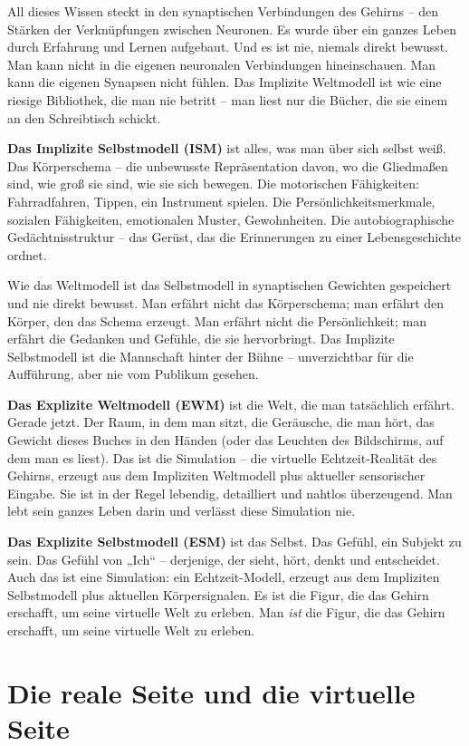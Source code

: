 \documentclass[11pt, twoside, openright]{book}
\begin{document}
All dieses Wissen steckt in den synaptischen Verbindungen des Gehirns -- den Stärken der Verknüpfungen zwischen Neuronen. Es wurde über ein ganzes Leben durch Erfahrung und Lernen aufgebaut. Und es ist nie, niemals direkt bewusst. Man kann nicht in die eigenen neuronalen Verbindungen hineinschauen. Man kann die eigenen Synapsen nicht fühlen. Das Implizite Weltmodell ist wie eine riesige Bibliothek, die man nie betritt -- man liest nur die Bücher, die sie einem an den Schreibtisch schickt.

\textbf{Das Implizite Selbstmodell (ISM)} ist alles, was man über sich selbst weiß. Das Körperschema -- die unbewusste Repräsentation davon, wo die Gliedmaßen sind, wie groß sie sind, wie sie sich bewegen. Die motorischen Fähigkeiten: Fahrradfahren, Tippen, ein Instrument spielen. Die Persönlichkeitsmerkmale, sozialen Fähigkeiten, emotionalen Muster, Gewohnheiten. Die autobiographische Gedächtnisstruktur -- das Gerüst, das die Erinnerungen zu einer Lebensgeschichte ordnet.

Wie das Weltmodell ist das Selbstmodell in synaptischen Gewichten gespeichert und nie direkt bewusst. Man erfährt nicht das Körperschema; man erfährt den Körper, den das Schema erzeugt. Man erfährt nicht die Persönlichkeit; man erfährt die Gedanken und Gefühle, die sie hervorbringt. Das Implizite Selbstmodell ist die Mannschaft hinter der Bühne -- unverzichtbar für die Aufführung, aber nie vom Publikum gesehen.

\textbf{Das Explizite Weltmodell (EWM)} ist die Welt, die man tatsächlich erfährt. Gerade jetzt. Der Raum, in dem man sitzt, die Geräusche, die man hört, das Gewicht dieses Buches in den Händen (oder das Leuchten des Bildschirms, auf dem man es liest). Das ist die Simulation -- die virtuelle Echtzeit-Realität des Gehirns, erzeugt aus dem Impliziten Weltmodell plus aktueller sensorischer Eingabe. Sie ist in der Regel lebendig, detailliert und nahtlos überzeugend. Man lebt sein ganzes Leben darin und verlässt diese Simulation nie.

\textbf{Das Explizite Selbstmodell (ESM)} ist das Selbst. Das Gefühl, ein Subjekt zu sein. Das Gefühl von „Ich“ -- derjenige, der sieht, hört, denkt und entscheidet. Auch das ist eine Simulation: ein Echtzeit-Modell, erzeugt aus dem Impliziten Selbstmodell plus aktuellen Körpersignalen. Es ist die Figur, die das Gehirn erschafft, um seine virtuelle Welt zu erleben. Man \textit{ist} die Figur, die das Gehirn erschafft, um seine virtuelle Welt zu erleben.

\section*{Die reale Seite und die virtuelle Seite}
\end{document}
